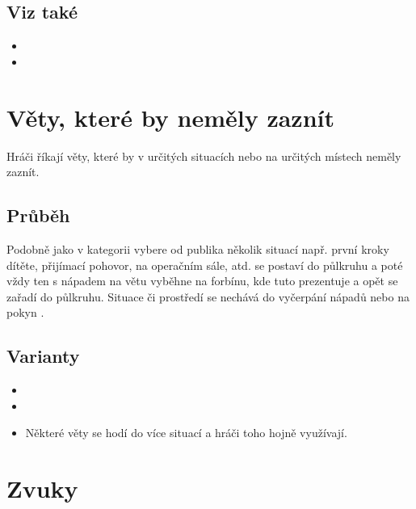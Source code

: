 \documentclass[main.tex]{subfiles}
\begin{document}
\subsection{Viz také} \begin{itemize}
\item {}
\item {}
\end{itemize}
 
 
 
\needspace{5cm} \section{Věty, které by neměly zaznít} \label{věty, které by neměly zaznít}  
 
 
Hráči říkají věty, které by v určitých situacích nebo na určitých místech neměly zaznít. 
 
 
\subsection{ Průběh } Podobně jako v kategorii  vybere  od publika několik situací např. první kroky dítěte, přijímací pohovor, na operačním sále, atd.  se postaví do půlkruhu a poté vždy ten s nápadem na větu vyběhne na forbínu, kde tuto  prezentuje a opět se zařadí do půlkruhu. Situace či prostředí se nechává do vyčerpání nápadů nebo na pokyn . 
 
\subsection{ Varianty } \begin{itemize}
\item  {}
\item  {}
\item  Některé věty se hodí do více situací a hráči toho hojně využívají.
\end{itemize}
 
 
 
 
\needspace{5cm} \section{Zvuky} \label{zvuky}  
 
\end{document}
